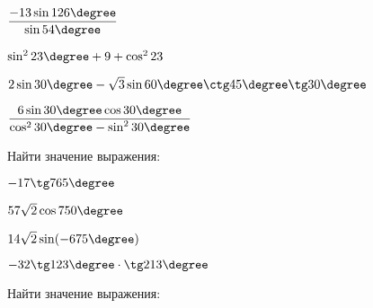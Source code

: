 \begin{listofex}
\begin{enumcols}[itemcolumns=2]
		\item \( \dfrac{-13\sin126\degree}{\sin54\degree} \)
		\item \( \sin^223\degree+9+\cos^223 \)
		\item \( 2\sin30\degree-\sqrt{3}\sin60\degree\ctg45\degree\tg30\degree\)
		\item \( \dfrac{6\sin30\degree\cos30\degree}{\cos^230\degree-\sin^230\degree} \)
	\end{enumcols}
	\item Найти значение выражения:
	\begin{enumcols}[itemcolumns=2]
		\item \( -17\tg765\degree \)
		\item \( 57\sqrt{2}\cos750\degree \)
		\item \( 14\sqrt{2}\sin(-675\degree) \)
		\item \( -32\tg123\degree\cdot\tg213\degree \)
	\end{enumcols}
	\item Найти значение выражения:
	\begin{enumcols}[itemcolumns=1]
		\item {}
		\item {}
		\item {}
		\item {}
		\item {}
		\item {}
	\end{enumcols}
\end{listofex}
%
%
%	
